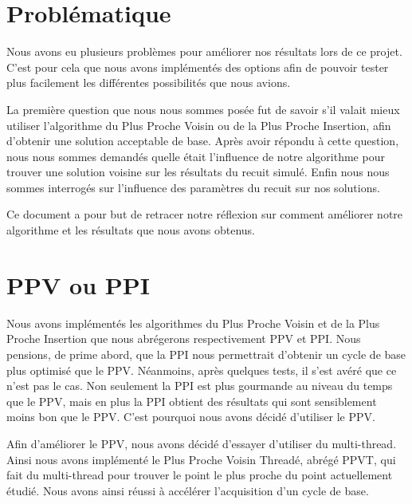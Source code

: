 \documentclass{article}
\begin{document}



\section{Problématique}

Nous avons eu plusieurs problèmes pour améliorer nos résultats lors de ce projet.
C'est pour cela que nous avons implémentés des options afin de pouvoir tester plus facilement les différentes possibilités que nous avions.
\par
La première question que nous nous sommes posée fut de savoir s'il valait mieux utiliser l'algorithme du Plus Proche Voisin ou de la Plus Proche Insertion, afin d'obtenir une solution acceptable de base.
Après avoir répondu à cette question, nous nous sommes demandés quelle était l'influence de notre algorithme pour trouver une solution voisine sur les résultats du recuit simulé.
Enfin nous nous sommes interrogés sur l'influence des paramètres du recuit sur nos solutions.
 
Ce document a pour but de retracer notre réflexion sur comment améliorer notre algorithme et les résultats que nous avons obtenus.
 
\section{PPV ou PPI}
 
Nous avons implémentés les algorithmes du Plus Proche Voisin et de la Plus Proche Insertion que nous abrégerons respectivement PPV et PPI.
Nous pensions, de prime abord, que la PPI nous permettrait d'obtenir un cycle de base plus optimisé que le PPV.
Néanmoins, après quelques tests, il s'est avéré que ce n'est pas le cas.
Non seulement la PPI est plus gourmande au niveau du temps que le PPV, mais en plus la PPI obtient des résultats qui sont sensiblement moins bon que le PPV.
C'est pourquoi nous avons décidé d'utiliser le PPV.
\par
Afin d'améliorer le PPV, nous avons décidé d'essayer d'utiliser du multi-thread.
Ainsi nous avons implémenté le Plus Proche Voisin Threadé, abrégé PPVT, qui fait du multi-thread pour trouver le point le plus proche du point actuellement étudié.
Nous avons ainsi réussi à accélérer l'acquisition d'un cycle de base.
 
\end{document}
